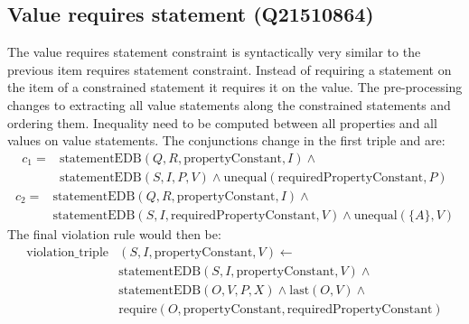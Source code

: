 \documentclass[hyperref,bachelorofscience,fleqn]{cgvpub}
\begin{document}
\subsection{Value requires statement (Q21510864)}
The value requires statement constraint is syntactically very similar to the previous item requires statement constraint. Instead of requiring a statement on the item of a constrained statement it requires it on the value. The pre-processing changes to extracting all value statements along the constrained statements and ordering them. Inequality need to be computed between all properties and all values on value statements. The conjunctions change in the first triple and are:
\begin{equation*}
\begin{split}
c_1 = &\text{statementEDB}(Q, R, \text{propertyConstant}, I) \wedge{} \\
&\text{statementEDB}(S, I, P, V) \wedge \text{unequal}(\text{requiredPropertyConstant}, P)
\end{split}
\end{equation*} \(\)
\begin{equation*}
\begin{split}
c_2 = &\text{statementEDB}(Q, R, \text{propertyConstant}, I) \wedge{} \\
&\text{statementEDB}(S, I, \text{requiredPropertyConstant}, V) \wedge \text{unequal}(\{A\}, V)
\end{split}
\end{equation*}
The final violation rule would then be:
\begin{equation*}
\begin{split}
\text{violation\_triple}&(S, I, \text{propertyConstant}, V) \leftarrow \\
&\text{statementEDB}(S, I, \text{propertyConstant}, V) \wedge{} \\
&\text{statementEDB}(O, V, P, X) \wedge \text{last}(O, V) \wedge{} \\
&\text{require}(O, \text{propertyConstant}, \text{requiredPropertyConstant})
\end{split}
\end{equation*}
\end{document}
